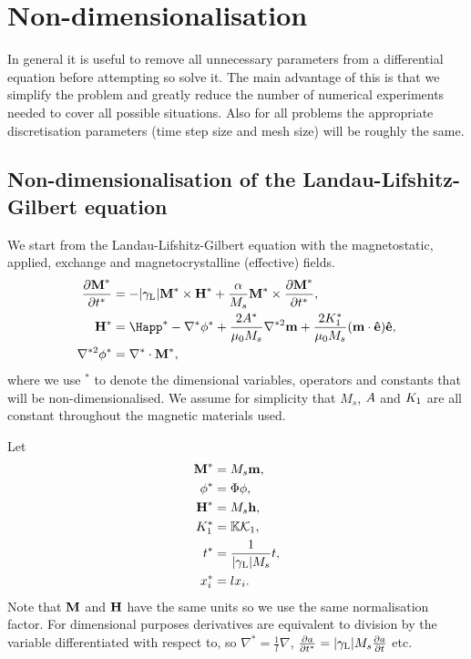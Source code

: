 \section{Non-dimensionalisation}
\label{sec:normalisations-appendix}

In general it is useful to remove all unnecessary parameters from a differential equation before attempting so solve it.
The main advantage of this is that we simplify the problem and greatly reduce the number of numerical experiments needed to cover all possible situations.
Also for all problems the appropriate discretisation parameters (time step size and mesh size) will be roughly the same.

\subsection{Non-dimensionalisation of the Landau-Lifshitz-Gilbert equation}
\label{sec:land-lifsh-gilb-normalisation}

We start from the Landau-Lifshitz-Gilbert equation with the magnetostatic, applied, exchange and magnetocrystalline (effective) fields.
\begin{align}
  \pd{\Mv^*}{t^*} &= - \gymagc \Mv^* \times \Hv^* + \frac{\alpha}{M_s} \Mv^* \times \pd{\Mv^*}{t^*},
                    \label{eqn:llgnd} \\
  \Hv^* &= \Happ^* - \grad^* \phi^* + \frac{2\Exchc^*}{\mu_0 M_s} \nabla^{*2} \mv + \frac{2\Kone^*}{\mu_0 M_s} (\mv \cdot \ev) \ev,
          \label{eqn:effnd} \\
  \nabla^{*2} \phi^* &= \grad^* \cdot \Mv^*,
                       \label{eqn:phind}
\end{align}
where we use $^*$ to denote the dimensional variables, operators and constants that will be non-dimensionalised. We assume for simplicity that $M_s$, $A$ and $K_1$ are all
constant throughout the magnetic materials used.

Let
\begin{equation}
  \label{eqn:nddefs}
  \begin{aligned}
    \boldsymbol{\mathrm{M}}^* &= M_s \boldsymbol{\mathrm{m}},  \\
    \phi^* &= \Phi \phi,  \\
    \boldsymbol{\mathrm{H}}^* &= M_s \boldsymbol{\mathrm{h}},  \\
    K_1^* &= \mathbb{K} \mathcal{K}_1,  \\
    t^* &= \frac{1}{{\left|{\gamma_{\mathrm{\tiny{L}}}} \right|} M_s} t,  \\
    x_i^* &= l x_i.
  \end{aligned}
\end{equation}
Note that $\boldsymbol{\mathrm{M}}$ and $\boldsymbol{\mathrm{H}}$ have the same units so we use the same normalisation factor. For dimensional purposes derivatives are equivalent to division by the variable differentiated with respect to, so $\nabla^* = \frac{1}{l} \nabla$, $\frac{\partial a}{\partial t^*} = {\left|{\gamma_{\mathrm{\tiny{L}}}} \right|} M_s \frac{\partial a}{\partial t}$ etc.

